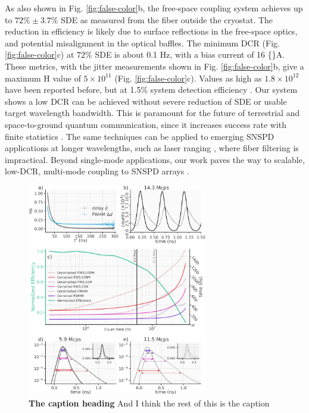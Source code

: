\documentclass[12pt]{caltech_thesis}
\begin{document}
As also shown in Fig. \ref{fig:false-color}b, the free-space coupling
system achieves up to \(72 \% \pm 3.7 \%\) SDE as measured from the
fiber outside the cryostat. The reduction in efficiency is likely due to
surface reflections in the free-space optics, and potential misalignment
in the optical baffles. The minimum DCR (Fig. \ref{fig:false-color}c) at
\(72 \%\) SDE is about 0.1 Hz, with a bias current of 16 \{\textmu\}A.
These metrics, with the jitter measurements shown in Fig.
\ref{fig:false-color}b, give a maximum H value of \(5 \times 10^{11}\)
(Fig. \ref{fig:false-color}c). Values as high as \(1.8 \times 10^{12}\)
have been reported before, but at 1.5\% system detection efficiency
\cite{Shibata2015}. Our system shows a low DCR can be achieved without
severe reduction of SDE or usable target wavelength bandwidth. This is
paramount for the future of terrestrial and space-to-ground quantum
communication, since it increases success rate with finite statistics
\cite{Boaron2018secure}. The same techniques can be applied to emerging
SNSPD applications at longer wavelengths, such as laser ranging
\cite{Taylor2019}, where fiber filtering is impractical. Beyond
single-mode applications, our work paves the way to scalable, low-DCR,
multi-mode coupling to SNSPD arrays \cite{Wollman2019}.

\hypertarget{fig:custom_figure}{%
\begin{figure}
\centering
\includegraphics[width=0.7\textwidth,height=\textheight]{chapter_01/./figs/Figure_Data_Sept_2022.svg}
\caption[{The second first caption.}]{\textbf{The caption heading} And I
think the rest of this is the caption}
\label{fig:custom_figure}
\end{figure}
}
\end{document}
